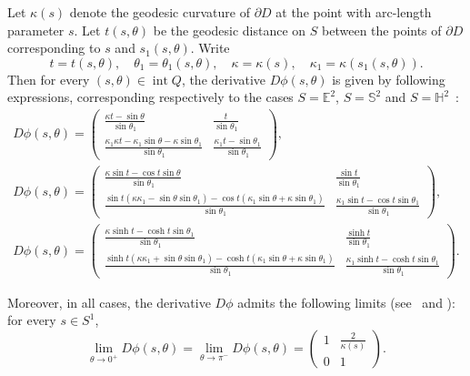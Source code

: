 \documentclass[a4paper,12pt,reqno]{amsart}
\numberwithin{equation}{section}
\begin{document}
Let $\kappa(s)$ denote the geodesic curvature of $\partial D$ at the point with arc-length parameter $s$. Let $t(s,\theta)$ be the geodesic distance on $S$ between the points of $\partial D$ corresponding to $s$ and $s_1(s,\theta)$. Write 
\[
t = t(s,\theta), \quad \theta_1 = \theta_1(s,\theta), \quad \kappa = \kappa(s), \quad \kappa_1 = \kappa(s_1(s,\theta)).
\] 
Then for every $(s,\theta) \in \operatorname{int} Q$, the derivative $D \phi(s,\theta)$ is given by following expressions, corresponding respectively to the cases $S=\mathbb{E}^2$, $S=\mathbb{S}^2$ and $S=\mathbb{H}^2$~\cite{Chernov:2006we,Katok:1986tg,dosSantos:2017}:
\begin{equation} \label{eq:derivative}
\begin{gathered}
D \phi(s,\theta) = 
\begin{pmatrix}
	\frac{\kappa t -\sin \theta}{\sin \theta_1} & \frac{t}{\sin \theta_1} \\
	\frac{\kappa_1 \kappa t -\kappa_1 \sin \theta -\kappa \sin \theta_1}{\sin \theta_1} & \frac{\kappa_1 t -\sin \theta_1}{\sin \theta_1} 
\end{pmatrix}, \\
D\phi(s,\theta) = 
\begin{pmatrix}
\frac{\kappa \sin t - \cos t \sin\theta}{\sin\theta_1} & \frac{\sin t}{\sin\theta_1}\\
\frac{\sin t (\kappa \kappa_1 - \sin\theta \sin\theta_1) - \cos t (\kappa_1 \sin\theta + \kappa \sin\theta_1)}{\sin\theta_1} & \frac{\kappa_1 \sin t - \cos t \sin\theta_1}{\sin\theta_1}
\end{pmatrix}, \\
D\phi(s,\theta) = 
\begin{pmatrix}
\frac{\kappa \sinh t - \cosh t \sin\theta_1}{\sin\theta_1} & \frac{\sinh t}{\sin\theta_1} \\
\frac{\sinh t (\kappa \kappa_1 + \sin\theta \sin\theta_1) - \cosh t (\kappa_1 \sin\theta + \kappa \sin\theta_1)}{\sin\theta_1} & \frac{\kappa_1 \sinh t - \cosh t \sin\theta_1}{\sin\theta_1}
\end{pmatrix}.
\end{gathered}
\end{equation}

Moreover, in all cases, the derivative $D\phi$ admits the following limits (see~\cite{Katok:1986tg} and \cite[Proposition~3.4]{DiasCarneiro:2024}): for every $s \in S^1$, 
\begin{equation} \label{eq:zeroangle}
\lim_{\theta \to 0^+}  D \phi(s,\theta) = \lim_{\theta \to \pi^-}  D \phi(s,\theta) =
\begin{pmatrix}
	1 & \frac{2}{\kappa(s)} \\
	0 & 1
\end{pmatrix}.
\end{equation}
\end{document}
